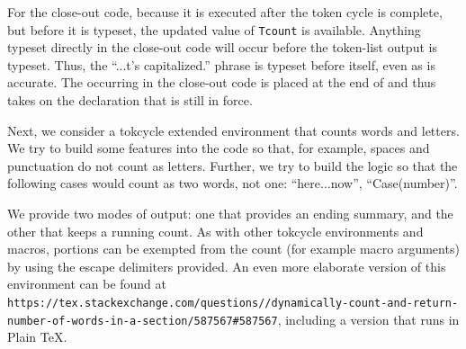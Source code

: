 \documentclass[10pt]{article}
\newcommand\TokCycle{\textsf{tokcycle}}
\begin{document}
\medskip
For the close-out code, because it is executed after the token cycle is 
  complete, but before it is typeset, the updated value of \texttt{Tcount}
  is available.
Anything typeset directly in the close-out code will occur before the
   token-list output is typeset. 
Thus, the ``...t's capitalized.'' phrase is typeset before 
  itself, even as  is accurate.
The  occurring in the close-out code is placed at the
  end of  and thus takes on the 
  declaration that is still in force.
\endgroup

\begingroup
\medskip
Next, we consider a \TokCycle{} extended environment that counts words and
  letters.
We try to build some features into the code so that, for example, spaces
  and punctuation do not count as letters.
Further, we try to build the logic so that the following cases would
  count as two words, not one: ``here...now'', ``Case(number)''.

\medskip
We provide two modes of output: one that provides an ending summary, and
  the other that keeps a running count.
As with other \TokCycle{} environments and macros, portions can be
  exempted from the count (for example macro arguments) by using the 
  escape delimiters provided.
An even more elaborate version of this environment can be found at
\texttt{https://tex.stackexchange.com/questions//dynamically-count-and-return-number-of-words-in-a-section/587567\#587567},%
\hfil in\-cluding a version that runs
  in Plain \TeX.

\end{document}
